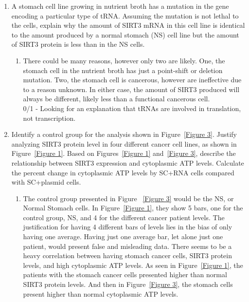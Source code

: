 \documentclass[11pt]{article}
\begin{document}
    \begin{enumerate}
        \item A stomach cell line growing in nutrient broth has a mutation in the gene encoding a particular
type of tRNA. Assuming the mutation is not lethal to the cells, explain why the amount
of SIRT3 mRNA in this cell line is identical to the amount produced by a normal stomach (NS)
cell line but the amount of SIRT3 protein is less than in the NS cells.
        \begin{enumerate}
            \item There could be many reasons, however only two are likely.
            One, the stomach cell in the nutrient broth has just a point-shift or deletion mutation.
            Two, the stomach cell is cancerous, however are ineffective due to a reason unknown.
            In either case, the amount of SIRT3 produced will always be different, likely less than a functional cancerous cell.\\
            0/1 - Looking for an explanation that tRNAs are involved in translation, not transcription.
        \end{enumerate}
        \item Identify a control group for the analysis shown in Figure~\ref{Figure 3}.
        Justify analyzing SIRT3 protein level in
        four different cancer cell lines, as shown in Figure~\ref{Figure 1}.
        Based on Figures~\ref{Figure 1} and~\ref{Figure 3}, describe the
        relationship between SIRT3 expression and cytoplasmic ATP levels.
        Calculate the percent change
        in cytoplasmic ATP levels by SC+RNA cells compared with SC+plasmid cells.
        \begin{enumerate}
            \item The control group presented in Figure ~\ref{Figure 3} would be the NS, or Normal Stomach cells.
            In Figure~\ref{Figure 1}, they show 5 bars, one for the control group, NS, and 4 for the different cancer patient levels.
            The justification for having 4 different bars of levels lies in the bias of only having one average.
            Having just one average bar, let alone just one patient, would present false and misleading data.
            There seems to be a heavy correlation between having stomach cancer cells, SIRT3 protein levels, and high cytoplasmic ATP levels.
            As seen in Figure~\ref{Figure 1}, the patients with the stomach cancer cells presented higher than normal SIRT3 protein levels.
            And then in Figure~\ref{Figure 3}, the stomach cells present higher than normal cytoplasmic ATP levels.

\end{enumerate}
\end{enumerate}
\end{document}
